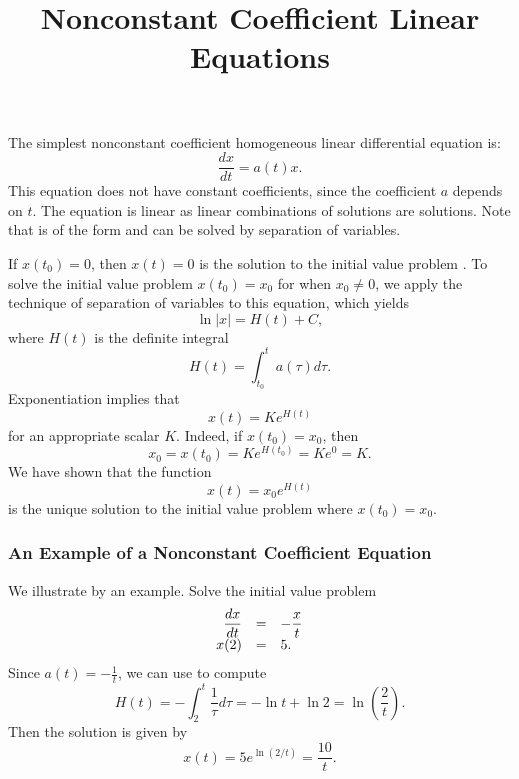 \documentclass{ximera}
\title{Nonconstant Coefficient Linear Equations}
\begin{document}
\begin{abstract}
\end{abstract}
\maketitle


\label{sec:VarConstS}

The simplest nonconstant coefficient homogeneous 
linear differential equation is:
\begin{equation}   \label{eq:linhomo1}
\frac{dx}{dt}  =  a(t)x.
\end{equation}
This equation does not have constant coefficients, since the coefficient 
$a$ depends on $t$.  The equation is linear as linear combinations of 
solutions are solutions.  Note that  is of the form 
 and can be solved by separation of variables. 

If $x(t_0)=0$, then $x(t)=0$ is the solution to the initial value problem
.
To solve the initial value problem $x(t_0)=x_0$ for 
when $x_0\neq 0$, we apply the technique of separation of variables to 
this equation, which yields
\[
\ln|x| = H(t) + C,
\]
where $H(t)$ is the definite integral
\begin{equation}   \label{e:H(t)}
H(t)=\int_{t_0}^t a(\tau)d\tau.
\end{equation}
Exponentiation implies that
\[
x(t) = Ke^{H(t)}
\]
for an appropriate scalar $K$.  Indeed, if $x(t_0)=x_0$, then
\[
x_0 = x(t_0) = Ke^{H(t_0)} = Ke^0 = K.
\]
We have shown that the function 
\begin{equation} \label{E:ssv}
x(t) = x_0 e^{H(t)}
\end{equation}
is the unique solution 
to the initial value problem 
 where $x(t_0)=x_0$.

\subsubsection*{An Example of a Nonconstant Coefficient Equation}

We illustrate  by an example. Solve the initial value problem
\[
\begin{array}{rcl}
\displaystyle \frac{dx}{dt} & = & -\displaystyle \frac{x}{t} \\
x(2) & = & 5.
\end{array}
\]
Since $a(t)=-\frac{1}{t}$, we can use  to compute
\[
H(t)=-\int_2^t \frac{1}{\tau}d\tau = -\ln t +\ln 2 =
\ln\left(\frac{2}{t}\right).
\]
Then the solution  is given by
\[
x(t) = 5 e^{\ln(2/t)} = \frac{10}{t}.
\]
\end{document}
